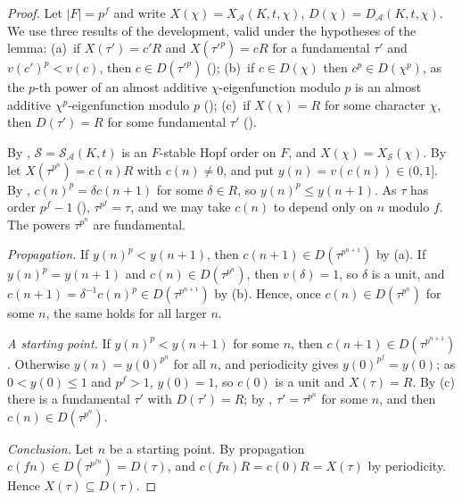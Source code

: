 \begin{proof}
Let $|F|=p^f$ and write $X(\chi)=X_{\mathcal A}(K,t,\chi)$, $D(\chi)=D_{\mathcal A}(K,t,\chi)$. We use three results of the
development, valid under the hypotheses of the lemma: (a)~if $X(\tau')=c'R$ and $X(\tau'^p)=cR$ for a fundamental $\tau'$ and
$v(c')^p<v(c)$, then $c\in D(\tau'^p)$ (); (b)~if $c\in D(\chi)$
then $c^p\in D(\chi^p)$, as the $p$-th power of an almost additive $\chi$-eigenfunction modulo $p$ is an almost additive
$\chi^p$-eigenfunction modulo $p$ (); (c)~if $X(\chi)=R$ for some
character $\chi$, then $D(\tau')=R$ for some fundamental $\tau'$ ().

By , $\mathcal S=\mathcal S_{\mathcal A}(K,t)$ is an $F$-stable Hopf
order on $F$, and $X(\chi)=X_{\mathcal S}(\chi)$. By  let
$X(\tau^{p^n})=c(n)R$ with $c(n)\ne0$, and put $y(n)=v(c(n))\in(0,1]$. By
, $c(n)^p=\delta c(n+1)$ for some $\delta\in R$, so
$y(n)^p\le y(n+1)$. As $\tau$ has order $p^f-1$ (),
$\tau^{p^f}=\tau$, and we may take $c(n)$ to depend only on $n$ modulo $f$. The powers $\tau^{p^n}$ are fundamental.

\emph{Propagation.} If $y(n)^p<y(n+1)$, then $c(n+1)\in D(\tau^{p^{n+1}})$ by (a). If $y(n)^p=y(n+1)$ and
$c(n)\in D(\tau^{p^n})$, then $v(\delta)=1$, so $\delta$ is a unit, and $c(n+1)=\delta^{-1}c(n)^p\in D(\tau^{p^{n+1}})$ by (b). Hence,
once $c(n)\in D(\tau^{p^n})$ for some $n$, the same holds for all larger $n$.

\emph{A starting point.} If $y(n)^p<y(n+1)$ for some $n$, then $c(n+1)\in D(\tau^{p^{n+1}})$. Otherwise $y(n)=y(0)^{p^n}$ for
all $n$, and periodicity gives $y(0)^{p^f}=y(0)$; as $0<y(0)\le1$ and $p^f>1$, $y(0)=1$, so $c(0)$ is a unit and $X(\tau)=R$. By
(c) there is a fundamental $\tau'$ with $D(\tau')=R$; by ,
$\tau'=\tau^{p^n}$ for some $n$, and then $c(n)\in D(\tau^{p^n})$.

\emph{Conclusion.} Let $n$ be a starting point. By propagation $c(fn)\in D(\tau^{p^{fn}})=D(\tau)$, and $c(fn)R=c(0)R=X(\tau)$ by
periodicity. Hence $X(\tau)\subseteq D(\tau)$.
\end{proof}

